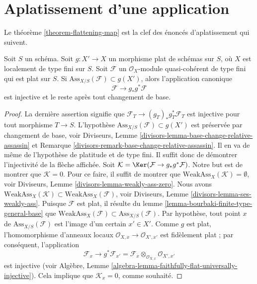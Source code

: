\section{Aplatissement d'une application}
\label{section-flattening-map}

\noindent
Le théorème \ref{theorem-flattening-map}
est la clef des énoncés d'aplatissement qui suivent.

\begin{lemma}
\label{lemma-universally-separating}
Soit $S$ un schéma.
Soit $g : X' \to X$ un morphisme plat de schémas sur $S$,
où $X$ est localement de type fini sur $S$.
Soit $\mathcal{F}$ un $\mathcal{O}_X$-module quasi-cohérent de type fini
qui est plat sur $S$. Si $\text{Ass}_{X/S}(\mathcal{F}) \subset g(X')$,
alors l'application canonique
$$
\mathcal{F} \longrightarrow g_*g^*\mathcal{F}
$$
est injective et le reste après tout changement de base.
\end{lemma}

\begin{proof}
La dernière assertion signifie que $\mathcal{F}_T \to (g_T)_*g_T^*\mathcal{F}_T$
est injective pour tout morphisme $T \to S$. L'hypothèse
$\text{Ass}_{X/S}(\mathcal{F}) \subset g(X')$ est préservée par changement de base, voir
Diviseurs, Lemme \ref{divisors-lemma-base-change-relative-assassin} et
Remarque \ref{divisors-remark-base-change-relative-assassin}.
Il en va de même de l'hypothèse de platitude et de type fini.
Il suffit donc de démontrer l'injectivité de la flèche affichée.
Soit $\mathcal{K} = \Ker(\mathcal{F} \to g_*g^*\mathcal{F})$.
Notre but est de montrer que $\mathcal{K} = 0$.
Pour ce faire, il suffit de montrer que
$\text{WeakAss}_X(\mathcal{K}) = \emptyset$, voir
Diviseurs, Lemme \ref{divisors-lemma-weakly-ass-zero}.
Nous avons
$\text{WeakAss}_X(\mathcal{K}) \subset \text{WeakAss}_X(\mathcal{F})$, voir
Diviseurs, Lemme \ref{divisors-lemma-ses-weakly-ass}.
Puisque $\mathcal{F}$ est plat, il résulte du
lemme \ref{lemma-bourbaki-finite-type-general-base}
que $\text{WeakAss}_X(\mathcal{F}) \subset \text{Ass}_{X/S}(\mathcal{F})$.
Par hypothèse, tout point $x$ de $\text{Ass}_{X/S}(\mathcal{F})$
est l'image d'un certain $x' \in X'$. Comme $g$ est plat, l'homomorphisme
d'anneaux locaux $\mathcal{O}_{X, x} \to \mathcal{O}_{X', x'}$
est fidèlement plat ; par conséquent, l'application
$$
\mathcal{F}_x
\longrightarrow
g^*\mathcal{F}_{x'} =
\mathcal{F}_x \otimes_{\mathcal{O}_{X, x}} \mathcal{O}_{X', x'}
$$
est injective (voir
Algèbre, Lemme \ref{algebra-lemma-faithfully-flat-universally-injective}).
Cela implique que $\mathcal{K}_x = 0$, comme souhaité.
\end{proof}

